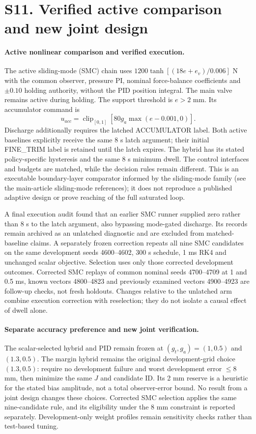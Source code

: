\section*{S11. Verified active comparison and new joint design}

\paragraph{Active nonlinear comparison and verified execution.}
The active sliding-mode (SMC) chain uses $1200\tanh[(18e+e_v)/0.006]$ N with the common observer, pressure PI, nominal force-balance coefficients and $\pm0.10$ holding authority, without the PID position integral. The main valve remains active during holding. The support threshold is $e>2$ mm. Its accumulator command is
\[
u_{acc}=\operatorname{clip}_{[0,1]}[80g_a\max(e-0.001,0)].
\]
Discharge additionally requires the latched ACCUMULATOR label. Both active baselines explicitly receive the same 8 s latch argument; their initial FINE\_TRIM label is retained until the latch expires. The hybrid has its stated policy-specific hysteresis and the same 8 s minimum dwell. The control interfaces and budgets are matched, while the decision rules remain different. This is an executable boundary-layer comparator informed by the sliding-mode family (see the main-article sliding-mode references); it does not reproduce a published adaptive design or prove reaching of the full saturated loop.

A final execution audit found that an earlier SMC runner supplied zero rather than 8 s to the latch argument, also bypassing mode-gated discharge. Its records remain archived as an unlatched diagnostic and are excluded from matched-baseline claims. A separately frozen correction repeats all nine SMC candidates on the same development seeds 4600--4602, 300 s schedule, 1 ms RK4 and unchanged scalar objective. Selection uses only those corrected development outcomes. Corrected SMC replays of common nominal seeds 4700--4709 at 1 and 0.5 ms, known vectors 4800--4823 and previously examined vectors 4900--4923 are follow-up checks, not fresh holdouts. Changes relative to the unlatched arm combine execution correction with reselection; they do not isolate a causal effect of dwell alone.

\paragraph{Separate accuracy preference and new joint verification.}
The scalar-selected hybrid and PID remain frozen at $(g_t,g_a)=(1,0.5)$ and $(1.3,0.5)$. The margin hybrid remains the original development-grid choice $(1.3,0.5)$: require no development failure and worst development error $\le8$ mm, then minimize the same $J$ and candidate ID. Its 2 mm reserve is a heuristic for the stated bias amplitude, not a total observer-error bound. No result from a joint design changes these choices. Corrected SMC selection applies the same nine-candidate rule, and its eligibility under the 8 mm constraint is reported separately. Development-only weight profiles remain sensitivity checks rather than test-based tuning.

